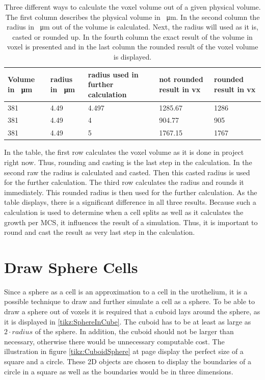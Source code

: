 \begin{table}[h]
\centering
\caption{Three different ways to calculate the voxel volume out of a given physical volume. The first column describes the physical volume in \SI{}{\micro\metre}. In the second column the radius in \SI{}{\micro\metre} out of the volume is calculated. Next, the radius will used as it is, casted or rounded up. In the fourth column the exact result of the volume in voxel is presented and in the last column the rounded result of the voxel volume is displayed.}
\renewcommand{\arraystretch}{1.5}
	\begin{tabularx}{\textwidth}{X||X||X||X||X}
		Volume in \SI{}{\micro\metre} & radius in \SI{}{\micro\metre} & radius used in further calculation & not rounded result in vx & rounded result in vx  \\
		\hline
		381 & 4.49 & 4.497 & 1285.67 & 1286 \\
		
		381 & 4.49 & 4 & 904.77 & 905\\
		
		381 & 4.49 & 5 & 1767.15 & 1767\\

	\end{tabularx}
	\label{tbl:Approximation error}
\end{table}

In the table, the first row calculates the voxel volume as it is done in project right now. Thus, rounding and casting is the last step in the calculation. In the second raw the radius is calculated and casted. Then this casted radius is used for the further calculation. The third row calculates the radius and rounds it immediately. This rounded radius is then used for the further calculation. \newline
As the table displays, there is a significant difference in all three results. Because such a calculation is used to determine when a cell splits as well as it calculates the growth per \ac{MCS}, it influences the result of a simulation. Thus, it is important to round and cast the result as very last step in the calculation.




\section{Draw Sphere Cells}
Since a sphere as a cell is an approximation to a cell in the urothelium, it is a possible technique to draw and further simulate a cell as a sphere. \newline 
To be able to draw a sphere out of voxels it is required that a cuboid lays around the sphere, as it is displayed in \ref{tikz:SphereInCube}. The cuboid has to be at least as large as $2 \cdot radius$ of the sphere. In addition, the cuboid should not be larger than necessary, otherwise there would be unnecessary computable cost. The illustration in figure \ref{tikz:CuboidSphere} at page \pageref{tikz:CuboidSphere} display the perfect size of a square and a circle. These 2D objects are chosen to display the boundaries of a circle in a square as well as the boundaries would be in three dimensions.


